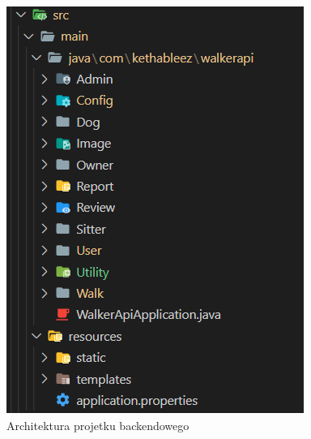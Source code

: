 \begin{figure}[H]
  \centering
  \includegraphics[width=0.5\linewidth]{rysunki/arch-java.PNG}
  \caption{Architektura projetku backendowego}
  \label{fig:java-architecture}
\end{figure}

